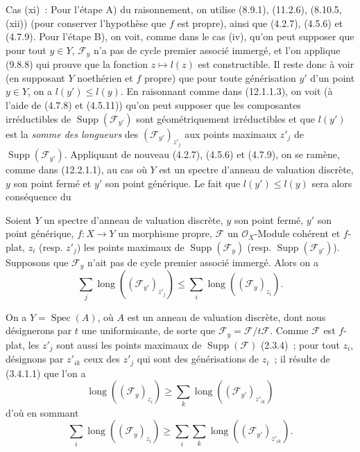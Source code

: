 Cas (xi)~: Pour l'étape A) du raisonnement, on utilise (8.9.1), (11.2.6),
(8.10.5, (xii)) (pour conserver l'hypothèse que $f$ est propre), ainsi que
(4.2.7), (4.5.6) et (4.7.9). Pour l'étape B), on voit, comme dans le cas (iv),
qu'on peut supposer que pour tout $y\in Y$, $\mathcal F_y$ n'a pas de cycle
premier associé immergé, et l'on applique (9.8.8) qui prouve que la fonction
$z\mapsto l(z)$ est constructible. Il reste donc à voir (en supposant $Y$
noethérien et $f$ propre) que pour toute générisation $y'$ d'un point $y\in Y$,
on a $l(y')\leq l(y)$. En raisonnant comme dans (12.1.1.3), on voit (à l'aide
de (4.7.8) et (4.5.11)) qu'on peut supposer que les composantes irréductibles
de $\operatorname{Supp}(\mathcal F_{y'})$ sont géométriquement irréductibles
et que $l(y')$ est la \emph{somme des longueurs} des
$(\mathcal F_{y'})_{z'_j}$ aux points maximaux $z'_j$ de
$\operatorname{Supp}(\mathcal F_{y'})$. Appliquant de nouveau (4.2.7), (4.5.6)
et (4.7.9), on se ramène, comme dans (12.2.1.1), au cas où $Y$ est un spectre
d'anneau de valuation discrète, $y$ son point fermé et $y'$ son point générique.
Le fait que $l(y')\leq l(y)$ sera alors conséquence du

\begin{lemma}[12.2.1.4]
\label{IV.12.2.1.4-fr}
Soient $Y$ un spectre d'anneau de valuation discrète, $y$ son point fermé,
$y'$ son point générique, $f:X\to Y$ un morphisme propre, $\mathcal F$ un
$\mathcal O_X$-Module cohérent et $f$-plat, $z_i$ (resp. $z'_j$) les points
maximaux de $\operatorname{Supp}(\mathcal F_y)$ (resp.
$\operatorname{Supp}(\mathcal F_{y'})$). Supposons que $\mathcal F_y$ n'ait
pas de cycle premier associé immergé. Alors on a
\[
  \sum_j\operatorname{long}((\mathcal F_{y'})_{z'_j})
  \leq\sum_i\operatorname{long}((\mathcal F_y)_{z_i}).
\]
\end{lemma}

On a $Y=\operatorname{Spec}(A)$, où $A$ est un anneau de valuation discrète,
dont nous désignerons par $t$ une uniformisante, de sorte que
$\mathcal F_y=\mathcal F/t\mathcal F$. Comme $\mathcal F$ est $f$-plat, les
$z'_j$ sont aussi les points maximaux de $\operatorname{Supp}(\mathcal F)$
(2.3.4)~; pour tout $z_i$, désignons par $z'_{ik}$ ceux des $z'_j$ qui sont des
générisations de $z_i$~; il résulte de (3.4.1.1) que l'on a
\[
  \operatorname{long}((\mathcal F_y)_{z_i})
  \geq\sum_k\operatorname{long}((\mathcal F_{y'})_{z'_{ik}})
\]
d'où en sommant
\[
  \sum_i\operatorname{long}((\mathcal F_y)_{z_i})
  \geq\sum_i\sum_k\operatorname{long}((\mathcal F_{y'})_{z'_{ik}}).
\]

